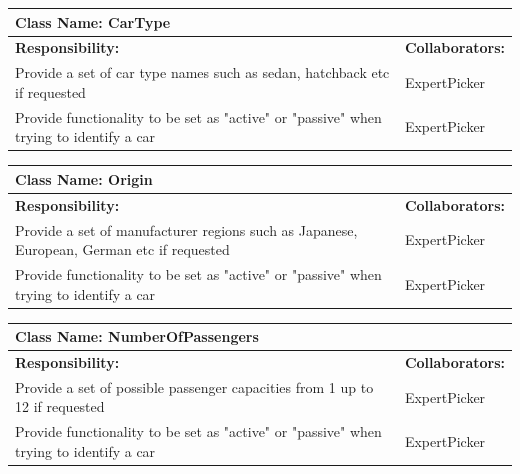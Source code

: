 \documentclass[12pt]{article}
\begin{document}
	\begin{table}[ht]
		\centering
		\begin{tabular}{|p{5cm}|p{5cm}|}
			\hline
			\multicolumn{2}{|l|}{\textbf{Class Name:} CarType} \\
			\hline
			\textbf{Responsibility:} & \textbf{Collaborators:} \\
			\hline
			Provide a set of car type names such as sedan, hatchback etc if requested & ExpertPicker\\
			\hline
			Provide functionality to be set as "active" or "passive" when trying to identify a car & ExpertPicker\\
			\hline
		\end{tabular}
	\end{table}
	
	\begin{table}[ht]
		\centering
		\begin{tabular}{|p{5cm}|p{5cm}|}
			\hline
			\multicolumn{2}{|l|}{\textbf{Class Name:} Origin} \\
			\hline
			\textbf{Responsibility:} & \textbf{Collaborators:} \\
			\hline
			Provide a set of manufacturer regions such as Japanese, European, German etc if requested & ExpertPicker\\
			\hline
			Provide functionality to be set as "active" or "passive" when trying to identify a car & ExpertPicker\\
			\hline
		\end{tabular}
	\end{table}
	
	\begin{table}[ht]
		\centering
		\begin{tabular}{|p{5cm}|p{5cm}|}
			\hline
			\multicolumn{2}{|l|}{\textbf{Class Name:} NumberOfPassengers} \\
			\hline
			\textbf{Responsibility:} & \textbf{Collaborators:} \\
			\hline
			Provide a set of possible passenger capacities from 1 up to 12 if requested & ExpertPicker\\
			\hline
			Provide functionality to be set as "active" or "passive" when trying to identify a car & ExpertPicker\\
			\hline
		\end{tabular}
	\end{table}

\FloatBarrier
\appendix
\end{document}
